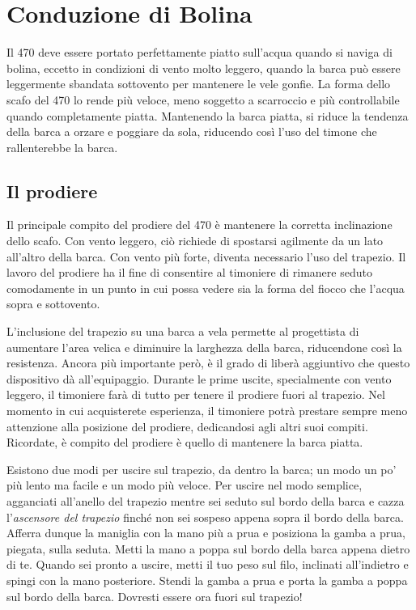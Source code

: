 
\section{Conduzione di Bolina}
\label{sec:ConduzioneDiBolina}
Il 470 deve essere portato perfettamente piatto sull'acqua quando si naviga di
bolina, eccetto in condizioni di vento molto leggero, quando la barca può essere
leggermente sbandata sottovento per mantenere le vele gonfie. La forma dello
scafo del 470 lo rende più veloce, meno soggetto a scarroccio e più
controllabile quando completamente piatta. Mantenendo la barca piatta, si riduce
la tendenza della barca a orzare e poggiare da sola, riducendo così l'uso del
timone che rallenterebbe la barca.

\subsection{Il prodiere}
\label{subsec:IlProdiere}
Il principale compito del prodiere del 470 è mantenere la corretta
inclinazione dello scafo. Con vento leggero, ciò richiede di spostarsi agilmente
da un lato all'altro della barca. Con vento più forte, diventa necessario l'uso
del trapezio. Il lavoro del prodiere ha il fine di consentire al timoniere di
rimanere seduto comodamente in un punto in cui possa vedere sia la forma del
fiocco che l'acqua sopra e sottovento.

L'inclusione del trapezio su una barca a vela permette al progettista di
aumentare l'area velica e diminuire la larghezza della barca, riducendone così
la resistenza. Ancora più importante però, è il grado di liberà aggiuntivo che questo
dispositivo dà all'equipaggio. Durante le prime uscite, specialmente con vento
leggero, il timoniere farà di tutto per tenere il prodiere fuori al trapezio.
Nel momento in cui acquisterete esperienza, il timoniere potrà prestare
sempre meno attenzione alla posizione del prodiere, dedicandosi agli altri suoi
compiti. Ricordate, è compito del prodiere è quello di mantenere la barca
piatta.

Esistono due modi per uscire sul trapezio, da dentro la barca; un modo un po'
più lento ma facile e un modo più veloce. Per uscire nel modo semplice,
agganciati all'anello del trapezio mentre sei seduto sul bordo della barca e
cazza l'\emph{ascensore del trapezio} finché non sei sospeso appena sopra il
bordo della barca. Afferra dunque la maniglia
con la mano più a prua e posiziona la gamba a prua, piegata, sulla seduta. Metti
la mano a poppa sul bordo della barca appena dietro di te. Quando sei pronto
a uscire, metti il tuo peso sul filo, inclinati all'indietro e spingi con la
mano posteriore. Stendi la gamba a prua e porta la gamba a poppa sul bordo
della barca. Dovresti essere ora fuori sul trapezio!

